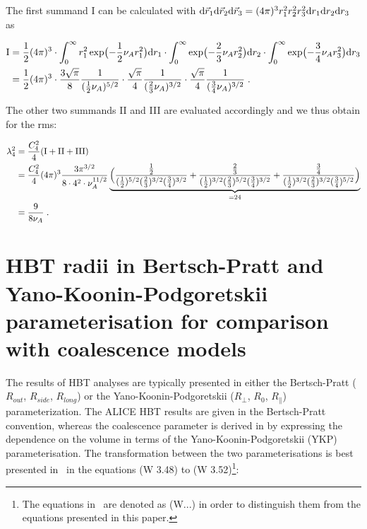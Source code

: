 \documentclass[a4paper,11pt]{scrartcl} %
\begin{document}
\begin{appendix}
\noindent The first summand I can be calculated with ${\rm d}\vec{r}_{1}{\rm d}\vec{r}_{2}{\rm d}\vec{r}_{3} = (4\pi)^3 r_1^2 r_2^2 r_3^2 {\rm d}r_{1}{\rm d}r_{2}{\rm d}r_{3}$ as

\begin{align}
 {\rm I} &= {1\over 2} (4\pi)^3 \cdot \int_{0}^{\infty} r_{1}^2 \exp\bigl(-{1\over2} \nu_A r_{1}^{2}\bigr){\rm d}r_{1} \cdot \int_{0}^{\infty}\exp\bigl(-{2\over3} \nu_A r_{2}^{2}\bigr) {\rm d}r_{2} \cdot \int_{0}^{\infty} \exp\bigl(-{3\over4} \nu_A r_{3}^{2}\bigr) {\rm d}r_{3} \\
 	&= {1\over 2} (4\pi)^3 \cdot {3\sqrt{\pi} \over 8} {1 \over ({1\over 2} \nu_{A})^{5/2}} \cdot {\sqrt{\pi} \over 4} {1 \over ({2\over 3} \nu_{A})^{3/2}} \cdot {\sqrt{\pi} \over 4} {1 \over ({3\over 4} \nu_{A})^{3/2}} \;.
\end{align}

\noindent The other two summands II and III are evaluated accordingly and we thus obtain for the rms:

\begin{align}
	\lambda_{4}^{2} &= {C_4^2 \over 4} ({\rm I} + {\rm II} + {\rm III} ) \\
	&= {C_4^2 \over 4} (4\pi)^3 {3\pi^{3/2} \over 8 \cdot 4^2 \cdot \nu_A^{11/2}} \underbrace{\Bigl({{1\over2} \over ({1\over2})^{5/2}({2\over3})^{3/2}({3\over4})^{3/2} } +
	{{2\over3} \over ({1\over2})^{3/2}({2\over3})^{5/2}({3\over4})^{3/2} } + {{3\over4} \over ({1\over2})^{3/2}({2\over3})^{3/2}({3\over4})^{5/2} } \Bigr)}_{= 24} \\
	&= {9 \over 8 \nu_A} \;.
\end{align}

%
%
\newpage
\section{HBT radii in Bertsch-Pratt and Yano-Koonin-Podgoretskii parameterisation for comparison with coalescence models}\label{appendix:YKP}

The results of HBT analyses are typically presented in either the Bertsch-Pratt ($R_{out}$, $R_{side}$, $R_{long}$) or the Yano-Koonin-Podgoretskii ($R_{\perp}$, $R_{0}$, $R_{\parallel}$) parameterization. The ALICE HBT results \cite{Aamodt:2011mr, Adam:2015vna} are given in the Bertsch-Pratt convention, whereas the coalescence parameter is derived in \cite{Scheibl:1998tk} by expressing the dependence on the volume in terms of the Yano-Koonin-Podgoretskii (YKP) parameterisation. 
The transformation between the two parameterisations is best presented in~\cite{Wiedemann:1999qn} in the equations (W 3.48) to (W 3.52)\footnote{The equations in~\cite{Wiedemann:1999qn} are denoted as (W...) in order to distinguish them from the equations presented in this paper.}:


\end{appendix}
\end{document}
